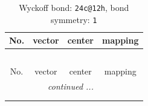 \documentclass[fleqn,8pt]{jsarticle}
\begin{document}
\renewcommand{\arraystretch}{1.2}
\begin{longtable}{cccc}
\caption{Wyckoff bond: {\tt 24c@12h}, bond symmetry: {\tt 1}}
 \\
 \hline \hline
No. & vector & center & mapping \\ \hline \endfirsthead

\multicolumn{3}{l}{\tablename\ \thetable{}} \\
 \hline \hline
No. & vector & center & mapping \\ \hline \endhead

 \hline \hline
\multicolumn{3}{r}{\footnotesize\it continued ...} \\ \endfoot

 \hline \hline
\multicolumn{3}{r}{} \\ \endlastfoot


\end{longtable}
\end{document}
